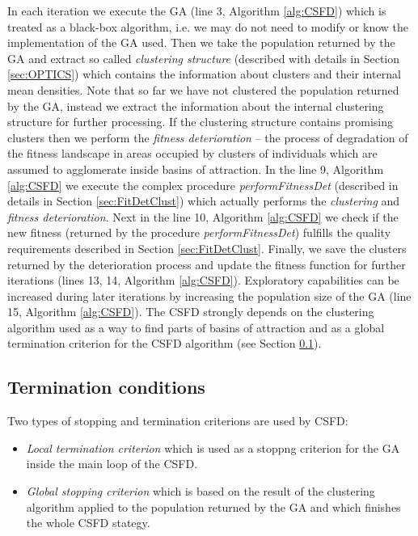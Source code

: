 In each iteration we execute the   
GA (line 3, Algorithm \ref{alg:CSFD}) which is
treated as a black-box algorithm, i.e. we may do not need to modify or know the
implementation of the GA used. Then we take the population returned by
the GA and extract so called \textit{clustering structure} (described 
with details in Section \ref{sec:OPTICS}) which contains the information about 
clusters and their internal mean densities.
Note that so far we have not clustered the population returned by
the GA, instead we extract the information about the internal clustering structure
for further processing.
If the clustering structure contains promising clusters then we perform the
\textit{fitness deterioration} -- the process of degradation of the fitness
landscape in areas occupied by clusters of individuals which are assumed
to agglomerate inside basins of attraction. 
In the line 9, Algorithm \ref{alg:CSFD} we execute the complex
procedure \textit{performFitnessDet} (described in details in Section
\ref{sec:FitDetClust}) which actually performs the
\textit{clustering} and \textit{fitness deterioration}. Next in the line 10, 
Algorithm \ref{alg:CSFD} we check if the new fitness 
(returned by the procedure \textit{performFitnessDet}) fulfills the 
quality requirements described in Section \ref{sec:FitDetClust}. 
Finally, we save the clusters returned by the deterioration process and update 
the fitness function for further iterations (lines 13, 14, Algorithm \ref{alg:CSFD}).
Exploratory capabilities can be increased during later iterations by
increasing the population size of the GA (line 15, Algorithm \ref{alg:CSFD}). 
The CSFD strongly depends on the clustering algorithm used as a way to find
parts of basins of attraction and as a global termination criterion for 
the CSFD algorithm (see Section \ref{sec:TermConditions}).



\subsection{Termination conditions}
\label{sec:TermConditions}



Two types of stopping and termination criterions 
are used by CSFD: 

\begin{itemize}
  
  \item 
  \textit{Local termination criterion} which is used as a stoppng criterion
  for the GA inside the main loop of the CSFD.  
  
  \item 
  \textit{Global stopping criterion} which is based on the result of the
  clustering algorithm applied to the population returned by the GA 
  and which finishes the whole CSFD stategy.

\end{itemize}


